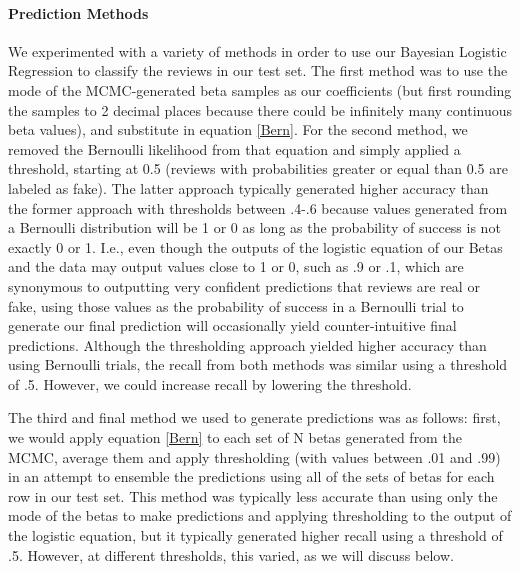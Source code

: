 \documentclass[man, floatsintext, 10pt]{apa6}
\begin{document}
\paragraph{Prediction Methods} We experimented with a variety of methods in order to use our Bayesian Logistic Regression to classify the reviews in our test set. The first method was to use the mode of the MCMC-generated beta samples as our coefficients (but first rounding the samples to 2 decimal places because there could be infinitely many continuous beta values), and substitute in equation \ref{Bern}. For the second method, we removed the Bernoulli likelihood from that equation and simply applied a threshold, starting at 0.5 (reviews with probabilities greater or equal than 0.5 are labeled as fake). The latter approach typically generated higher accuracy than the former approach with thresholds between .4-.6 because values generated from a Bernoulli distribution will be 1 or 0 as long as the probability of success is not exactly 0 or 1. I.e., even though the outputs of the logistic equation of our Betas and the data may output values close to 1 or 0, such as .9 or .1, which are synonymous to outputting very confident predictions that reviews are real or fake, using those values as the probability of success in a Bernoulli trial to generate our final prediction will occasionally yield counter-intuitive final predictions. Although the thresholding approach yielded higher accuracy than using Bernoulli trials, the recall from both methods was similar using a threshold of .5. However, we could increase recall by lowering the threshold. 



The third and final method we used to generate predictions was as follows: first, we would apply equation \ref{Bern} to each set of N betas generated from the MCMC, average them and apply thresholding (with values between .01 and .99) in an attempt to ensemble the predictions using all of the sets of betas for each row in our test set. This method was typically less accurate than using only the mode of the betas to make predictions and applying thresholding to the output of the logistic equation, but it typically generated higher recall using a threshold of .5.  However, at different thresholds, this varied, as we will discuss below. 
\end{document}
